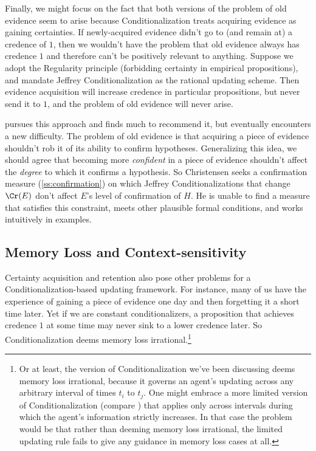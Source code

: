 Finally, we might focus on the fact that both versions of the problem of old evidence seem to arise because Conditionalization treats acquiring evidence as gaining certainties. If newly-acquired evidence didn't go to (and remain at) a credence of $1$, then we wouldn't have the problem that old evidence always has credence $1$ and therefore can't be positively relevant to anything. Suppose we adopt the Regularity principle (forbidding certainty in empirical propositions), and mandate Jeffrey Conditionalization as the rational updating scheme. Then evidence acquisition will increase credence in particular propositions, but never send it to $1$, and the problem of old evidence will never arise.

\citet{ChristensenMeasuring} pursues this approach and finds much to recommend it, but eventually encounters a new difficulty. The problem of old evidence is that acquiring a piece of evidence shouldn't rob it of its ability to confirm hypotheses. Generalizing this idea, we should agree that becoming more \emph{confident} in a piece of evidence shouldn't affect the \emph{degree} to which it confirms a hypothesis. So Christensen seeks a confirmation measure (\autoref{ss:confirmation}) on which Jeffrey Conditionalizations that change $\Cr(E)$ don't affect $E$'s level of confirmation of $H$. He is unable to find a measure that satisfies this constraint, meets other plausible formal conditions, and works intuitively in examples.


\subsection{Memory Loss and Context-sensitivity}
Certainty acquisition and retention also pose other problems for a Conditionalization-based updating framework. For instance, many of us have the experience of gaining a piece of evidence one day and then forgetting it a short time later. Yet if we are constant conditionalizers, a proposition that achieves credence $1$ at some time may never sink to a lower credence later. So Conditionalization deems memory loss irrational.\footnote
{Or at least, the version of Conditionalization we've been discussing deems memory loss irrational, because it governs an agent's updating across any arbitrary interval of times $t_i$ to $t_j$. One might embrace a more limited version of Conditionalization (compare \cite[Chapter\ 6]{TitelbaumQuitting}) that applies only across intervals during which the agent's information strictly increases. In that case the problem would be that rather than deeming memory loss irrational, the limited updating rule fails to give any guidance in memory loss cases at all.}

